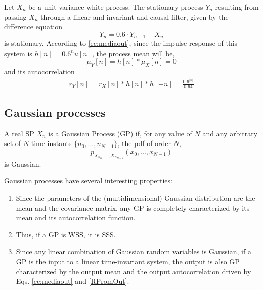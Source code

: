 \begin{example}
  \label{eg:v_estac_ergod}
Let $X_n$ be a unit variance white process. The stationary process $Y_n$ resulting from passing $X_n$ through a linear and invariant and causal filter, given by the difference equation
  \begin{equation}
    Y_n = 0.6 \cdot Y_{n-1} + X_n
  \end{equation}
is stationary. According to \eqref{ec:mediaout}, since the impulse response of this system is $h[n]=0.6^n u[n]$, the process mean will be, 
\begin{equation}
\mu_Y[n] = h[n]*\mu_X[n] = 0
\label{ec:meanv_mediate}
\end{equation}
and its autocorrelation
\begin{eqnarray}
r_Y[n] = r_X[n]*h[n]*h[-n] = \frac{0.6^{|n|}}{0.64}
\label{ec:Rvv_Rrr}
\end{eqnarray}
\end{example}


\subsection{Gaussian processes}
\label{sec:snr}

\begin{definition}
A real SP $X_n$ is a Gaussian Process (GP) if, for any value of $N$ and any arbitrary set of $N$ time instants $\{n_0,\ldots, n_{N-1}\}$, the pdf of order $N$, 
\begin{equation}
p_{X_{n_0},\ldots, X_{n_{N-1}}} (x_0,\ldots,x_{N-1})
\end{equation}
is Gaussian.
\end{definition}

Gaussian processes have several interesting properties:
\begin{enumerate}
\item Since the parameters of the (multidimensional) Gaussian distribution are the mean and the covariance matrix, any GP is completely characterized by its mean and its autocorrelation function.
\item Thus, if a GP is WSS, it is SSS.
\item Since any linear combination of Gaussian random variables is Gaussian, if a GP is the input to a linear time-invariant system, the output is also GP characterized by the output mean and the output autocorrelation driven by Eqs. \eqref{ec:mediaout} and \eqref{RPromOut}.
\end{enumerate}

